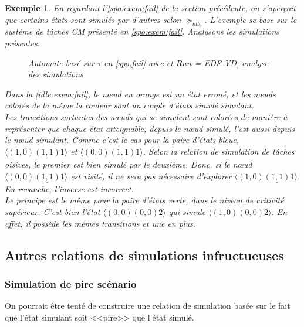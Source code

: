 \documentclass[12pt,a4paper,oneside]{book}
\theoremstyle{break}
\newtheorem{exem}{Exemple}[chapter]
\theoremstyle{breakplain}
\begin{document}
\begin{exem}

En regardant l'\autoref{spo:exem:fail} de la section précédente, on s'aperçoit que certains états sont simulés par d'autres selon $\succeq_{idle}$. L'exemple se base sur le système de tâches CM présenté en \autoref{spo:exem:fail}. Analysons les simulations présentes.\\
\begin{figure}[h]
\centering
    \resizebox{\textwidth}{!}{
    \fontsize{28pt}{12pt}\selectfont

}
\caption{Automate basé sur $\tau$ en \autoref{spo:fail} avec et $Run$ = \textit{EDF-VD}, analyse des simulations}
\label{idle:exem:fail}

\end{figure} 

Dans la \autoref{idle:exem:fail}, le nœud en orange est un état erroné, et les nœuds colorés de la même la couleur sont un couple d'états simulé simulant.\\

Les transitions sortantes des nœuds qui se simulent sont colorées de manière à représenter que  chaque état atteignable, depuis le nœud simulé, l'est aussi depuis le nœud simulant. Comme c'est le cas pour la paire d'états bleue, $\langle (1,0) \underline{(1,1)} 1 \rangle$ et $\langle (0,0) \underline{(1,1)} 1 \rangle$. Selon la relation de simulation de tâches oisives, le premier est bien simulé par le deuxième. Donc, si le nœud $\langle (0,0) \underline{(1,1)} 1 \rangle$ est visité, il ne sera pas nécessaire d'explorer $\langle (1,0) \underline{(1,1)} 1 \rangle$. En revanche, l'inverse est incorrect.\\

Le principe est le même pour la paire d'états verte, dans le niveau de criticité supérieur. C'est bien l'état $\langle (0,0) (0,0) 2 \rangle$ qui simule $\langle (1,0) (0,0) 2 \rangle$. En effet, il possède les mêmes transitions et une en plus.

\end{exem}

\subsection{Autres relations de simulations infructueuses}
\subsubsection{Simulation de pire scénario}
On pourrait être tenté de construire une relation de simulation basée sur le fait que l'état simulant soit <<pire>> que l'état simulé.
\end{document}
